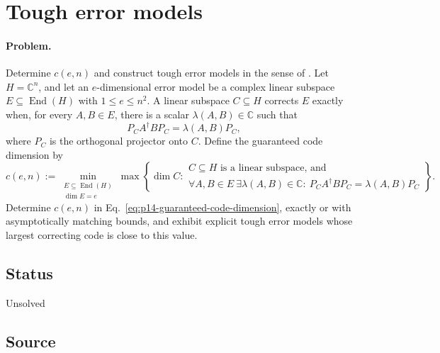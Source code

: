 \section{Tough error models}
\label{sec:op_b1b41f737f9b4aeb}

\paragraph{Problem.}
Determine $c(e,n)$ and construct tough error models in the sense of
.  Let
$H=\mathbb{C}^n$, and let an $e$-dimensional error model be a complex linear
subspace $E\subseteq\operatorname{End}(H)$ with $1\le e\le n^2$.  A linear
subspace $C\subseteq H$ corrects $E$ exactly when, for every $A,B\in E$, there
is a scalar $\lambda(A,B)\in\mathbb{C}$ such that
\begin{equation}
  P_C A^\dagger B P_C=\lambda(A,B)P_C,
  \label{eq:p14-error-correction-condition}
\end{equation}
where $P_C$ is the orthogonal projector onto $C$.  Define the guaranteed code
dimension by
\begin{equation}
  c(e,n)
  :=\min_{\substack{E\subseteq\operatorname{End}(H)\\
                    \dim E=e}}
    \max\left\{
      \dim C:
      \begin{array}{l}
        C\subseteq H\text{ is a linear subspace, and}\\
        \forall A,B\in E\ \exists\lambda(A,B)\in\mathbb{C}:\
        P_C A^\dagger B P_C=\lambda(A,B)P_C
      \end{array}
    \right\}.
  \label{eq:p14-guaranteed-code-dimension}
\end{equation}
Determine $c(e,n)$ in Eq.~\eqref{eq:p14-guaranteed-code-dimension}, exactly
or with asymptotically matching bounds, and exhibit explicit tough error
models whose largest correcting code is close to this value.

\subsection*{Status}

Unsolved

\subsection*{Source}


